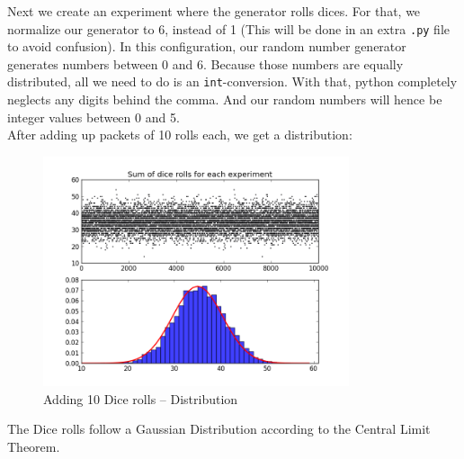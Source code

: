 \documentclass{article}
\begin{document}
Next we create an experiment where the generator rolls dices. For that, we
normalize our generator to 6, instead of 1 (This will be done in an extra
\texttt{.py} file to avoid confusion). In this configuration, our random number
generator generates numbers between 0 and 6. Because those numbers are equally
distributed, all we need to do is an \texttt{int}-conversion. With that,
python completely neglects any digits behind the comma. And our random numbers
will hence be integer values between 0 and 5. \\
After adding up packets of 10 rolls each, we get a distribution:
\begin{figure}[H]
    \centering
    \includegraphics[width=9cm]{Fig1-5.png}
    \caption{Adding 10 Dice rolls -- Distribution}
\end{figure}
The Dice rolls follow a Gaussian Distribution according to the Central Limit
Theorem.
\end{document}

